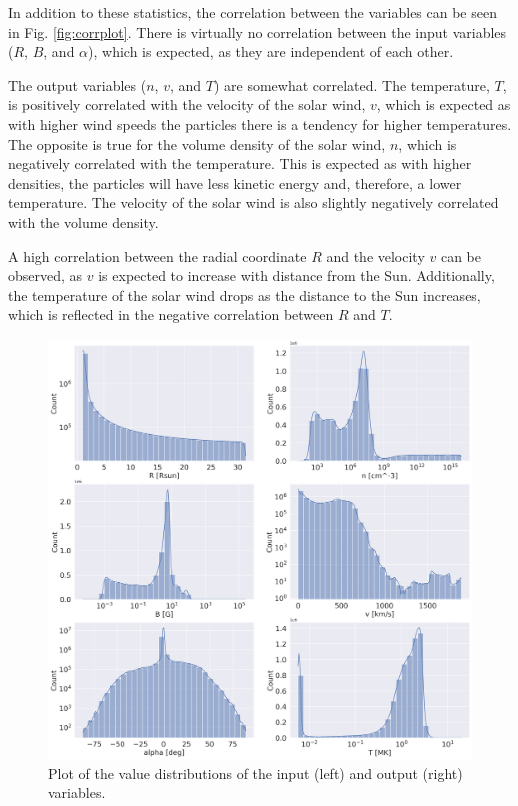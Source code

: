 In addition to these statistics, the correlation between the variables can be seen in Fig. \ref{fig:corrplot}. There is virtually no correlation between the input variables ($R$, $B$, and $\alpha$), which is expected, as they are independent of each other. 

The output variables ($n$, $v$, and $T$) are somewhat correlated. The temperature, $T$, is positively correlated with the velocity of the solar wind, $v$, which is expected as with higher wind speeds the particles there is a tendency for higher temperatures. The opposite is true for the volume density of the solar wind, $n$, which is negatively correlated with the temperature. This is expected as with higher densities, the particles will have less kinetic energy and, therefore, a lower temperature. The velocity of the solar wind is also slightly negatively correlated with the volume density.

A high correlation between the radial coordinate $R$ and the velocity $v$ can be observed, as $v$ is expected to increase with distance from the Sun. Additionally, the temperature of the solar wind drops as the distance to the Sun increases, which is reflected in the negative correlation between $R$ and $T$.


\begin{figure}
    \centering
    \includegraphics[width=\textwidth]{figures/joint_var_distribution.png}
    \caption{Plot of the value distributions of the input (left) and output (right) variables.}
    \label{fig:joint_vars_distr}
\end{figure}

